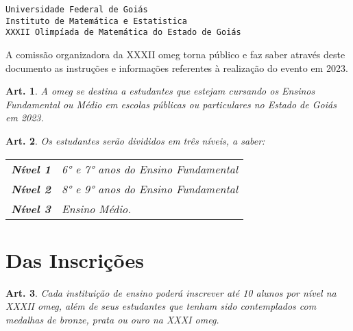 \documentclass[a4paper,12pt]{article}
\newtheorem{article}{Art.}
\def\previousEdition{XXXI}
\def\currentEdition{XXXII}
\def\year{2023}
\begin{document}
\begin{center}
  \texttt{Universidade Federal de Goiás}                    \\
  \texttt{Instituto de Matemática e Estatistica}            \\
  \texttt{XXXII Olimpíada de Matemática do Estado de Goiás}
\end{center}

\vspace{24pt}

A comissão organizadora da \currentEdition{} \acrfull{omeg} torna público e faz
saber através deste documento as instruções e informações referentes à
realização do evento em \year.

\vspace{24pt}

\begin{article}
  A \acrshort{omeg} se destina a estudantes que estejam cursando os Ensinos
  Fundamental ou Médio em escolas públicas ou particulares no Estado de Goiás
  em \year.
\end{article}

\begin{article}
  Os estudantes serão divididos em três níveis, a saber:
  \begin{table}[H]
    \centering
    \begin{tabular}{ll}
      \textbf{Nível 1} & 6° e 7° anos do Ensino Fundamental \\
      \textbf{Nível 2} & 8° e 9° anos do Ensino Fundamental \\
      \textbf{Nível 3} & Ensino Médio.
    \end{tabular}
  \end{table}
\end{article}

\section*{Das Inscrições}

\begin{article}
  Cada instituição de ensino poderá inscrever até 10 alunos por nível na
  \currentEdition{} \acrshort{omeg}, além de seus estudantes que tenham sido
  contemplados com medalhas de bronze, prata ou ouro na \previousEdition{}
  \acrshort{omeg}.
\end{article}
\end{document}
